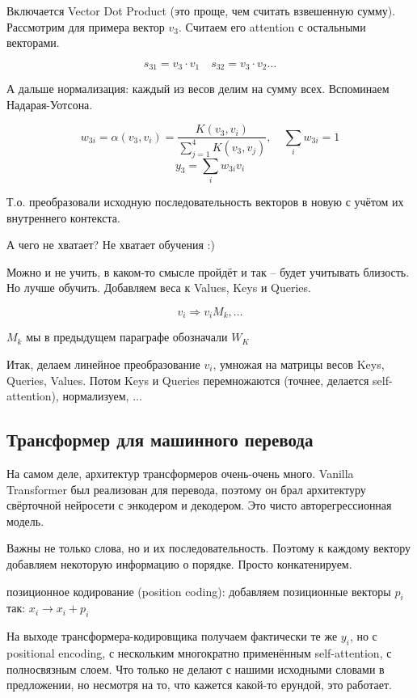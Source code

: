 \documentclass[a4paper,12pt]{article}
\begin{document}
Включается Vector Dot Product (это проще, чем считать взвешенную сумму).
Рассмотрим для примера вектор $ v_3 $.
Считаем его attention с остальными векторами.

\[
s_{31} = v_3 \cdot v_1 \quad %
s_{32} = v_3 \cdot v_2
\dots 
\]

А дальше нормализация: каждый из весов делим на сумму всех.
Вспоминаем Надарая-Уотсона.

\[ w_{3i} = \alpha (v_3, v_i) = \frac{K(v_3, v_i)}{\sum_{j=1}^4 K(v_3, v_j)}, \quad \sum_i w_{3i} = 1 \]
\[ y_3 = \sum_i w_{3i} v_i \]

Т.о. преобразовали исходную последовательность векторов в новую с учётом их внутреннего контекста.

А чего не хватает?
Не хватает обучения :)

Можно и не учить, в каком-то смысле пройдёт и так -- будет учитывать близость.
Но лучше обучить.
Добавляем веса к Values, Keys и Queries.

\[ v_i \Rightarrow v_i M_k,  \dots \]

$ M_k $ мы в предыдущем параграфе обозначали $ W_K $

Итак, делаем линейное преобразование $ v_i $, умножая на матрицы весов Keys, Queries, Values.
Потом Keys и Queries перемножаются (точнее, делается self-attention), нормализуем, ...

\subsection{Трансформер для машинного перевода}

На самом деле, архитектур трансформеров очень-очень много.
Vanilla Transformer был реализован для перевода, поэтому он брал архитектуру свёрточной нейросети с энкодером и декодером.
Это чисто авторегрессионная модель.

Важны не только слова, но и их последовательность.
Поэтому к каждому вектору добавляем некоторую информацию о порядке.
Просто конкатенируем.

позиционное кодирование (position coding): добавляем позиционные векторы $ p_i $ так: $ x_i \to x_i + p_i $

На выходе трансформера-кодировщика получаем фактически те же $ y_i $, но с positional encoding, с нескольким многократно применённым self-attention, с полносвязным слоем.
Что только не делают с нашими исходными словами в предложении, но несмотря на то, что кажется какой-то ерундой, это работает.
\end{document}
